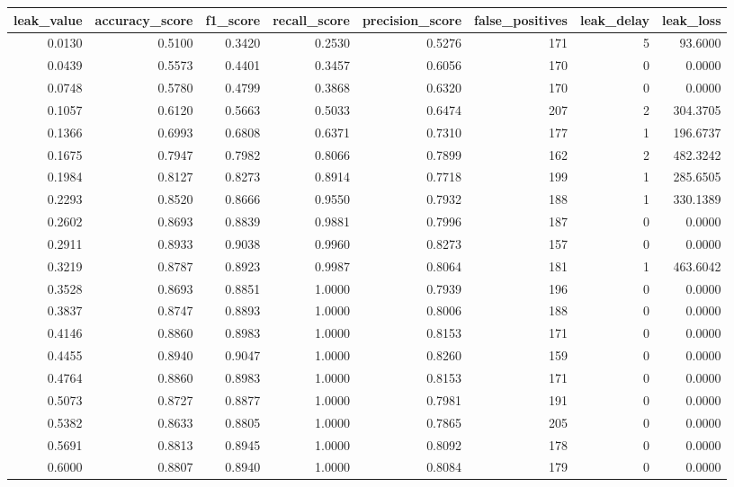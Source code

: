 \begin{tabular}{rrrrrrrr}
\toprule
leak\_value & accuracy\_score & f1\_score & recall\_score & precision\_score & false\_positives & leak\_delay & leak\_loss \\
\midrule
0.0130 & 0.5100 & 0.3420 & 0.2530 & 0.5276 & 171 & 5 & 93.6000 \\
0.0439 & 0.5573 & 0.4401 & 0.3457 & 0.6056 & 170 & 0 & 0.0000 \\
0.0748 & 0.5780 & 0.4799 & 0.3868 & 0.6320 & 170 & 0 & 0.0000 \\
0.1057 & 0.6120 & 0.5663 & 0.5033 & 0.6474 & 207 & 2 & 304.3705 \\
0.1366 & 0.6993 & 0.6808 & 0.6371 & 0.7310 & 177 & 1 & 196.6737 \\
0.1675 & 0.7947 & 0.7982 & 0.8066 & 0.7899 & 162 & 2 & 482.3242 \\
0.1984 & 0.8127 & 0.8273 & 0.8914 & 0.7718 & 199 & 1 & 285.6505 \\
0.2293 & 0.8520 & 0.8666 & 0.9550 & 0.7932 & 188 & 1 & 330.1389 \\
0.2602 & 0.8693 & 0.8839 & 0.9881 & 0.7996 & 187 & 0 & 0.0000 \\
0.2911 & 0.8933 & 0.9038 & 0.9960 & 0.8273 & 157 & 0 & 0.0000 \\
0.3219 & 0.8787 & 0.8923 & 0.9987 & 0.8064 & 181 & 1 & 463.6042 \\
0.3528 & 0.8693 & 0.8851 & 1.0000 & 0.7939 & 196 & 0 & 0.0000 \\
0.3837 & 0.8747 & 0.8893 & 1.0000 & 0.8006 & 188 & 0 & 0.0000 \\
0.4146 & 0.8860 & 0.8983 & 1.0000 & 0.8153 & 171 & 0 & 0.0000 \\
0.4455 & 0.8940 & 0.9047 & 1.0000 & 0.8260 & 159 & 0 & 0.0000 \\
0.4764 & 0.8860 & 0.8983 & 1.0000 & 0.8153 & 171 & 0 & 0.0000 \\
0.5073 & 0.8727 & 0.8877 & 1.0000 & 0.7981 & 191 & 0 & 0.0000 \\
0.5382 & 0.8633 & 0.8805 & 1.0000 & 0.7865 & 205 & 0 & 0.0000 \\
0.5691 & 0.8813 & 0.8945 & 1.0000 & 0.8092 & 178 & 0 & 0.0000 \\
0.6000 & 0.8807 & 0.8940 & 1.0000 & 0.8084 & 179 & 0 & 0.0000 \\
\bottomrule
\end{tabular}
